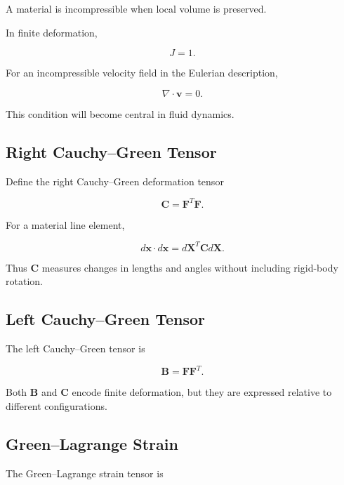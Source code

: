A material is incompressible when local volume is preserved.

In finite deformation,

\[
\boxed{
J=1.
}
\]

For an incompressible velocity field in the Eulerian description,

\[
\boxed{
\nabla\cdot\mathbf{v}=0.
}
\]

This condition will become central in fluid dynamics.

\subsection{Right Cauchy--Green Tensor}
\label{subsec:right-cauchy-green}

Define the right Cauchy--Green deformation tensor

\[
\boxed{
\mathbf{C}
=
\mathbf{F}^{T}\mathbf{F}.
}
\]

For a material line element,

\[
d\mathbf{x}\cdot d\mathbf{x}
=
d\mathbf{X}^{T}
\mathbf{C}
d\mathbf{X}.
\]

Thus \(\mathbf{C}\) measures changes in lengths and angles without including
rigid-body rotation.

\subsection{Left Cauchy--Green Tensor}
\label{subsec:left-cauchy-green}

The left Cauchy--Green tensor is

\[
\boxed{
\mathbf{B}
=
\mathbf{F}\mathbf{F}^{T}.
}
\]

Both \(\mathbf{B}\) and \(\mathbf{C}\) encode finite deformation, but they are
expressed relative to different configurations.

\subsection{Green--Lagrange Strain}
\label{subsec:green-lagrange-strain}

The Green--Lagrange strain tensor is

